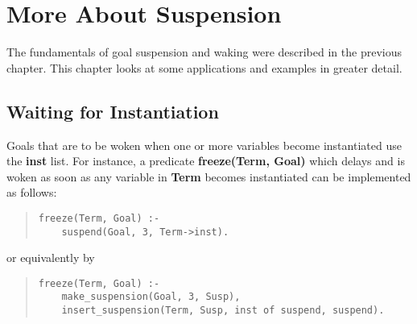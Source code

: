 %
% 
% 
% 
% 
%
%

\chapter{More About Suspension}

The fundamentals of goal suspension and waking were described in the
previous chapter.
This chapter looks at some applications and 
examples in greater detail.

\section{Waiting for Instantiation}
Goals that are to be woken when one or more variables become
instantiated use the {\bf inst} list.
For instance, a predicate {\bf freeze(Term, Goal)} which
delays and is woken as soon as any variable in {\bf Term}
becomes instantiated can be implemented as follows:

\begin{quote}
\begin{verbatim}
freeze(Term, Goal) :-
    suspend(Goal, 3, Term->inst).
\end{verbatim}
\end{quote}

or equivalently by
\begin{quote}
\begin{verbatim}
freeze(Term, Goal) :-
    make_suspension(Goal, 3, Susp),
    insert_suspension(Term, Susp, inst of suspend, suspend).
\end{verbatim}
\end{quote}

